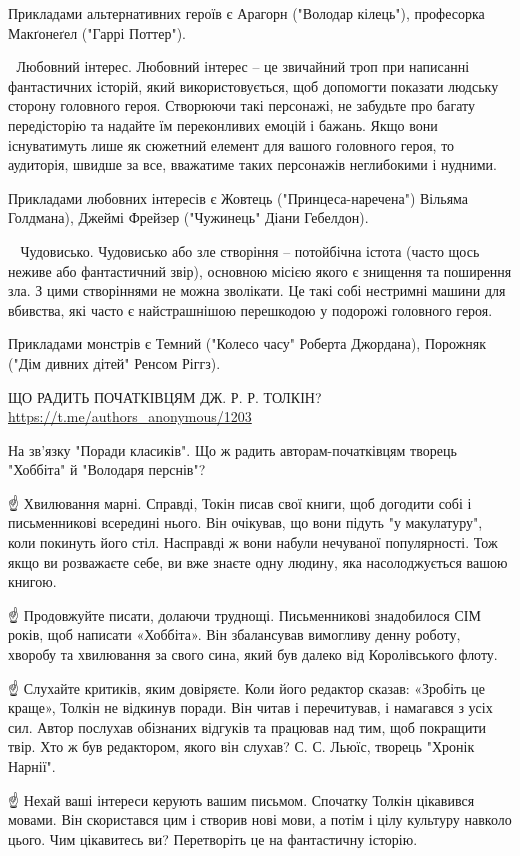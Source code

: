Прикладами альтернативних героїв є Арагорн ("Володар кілець"), професорка Макґонеґел ("Гаррі Поттер").

💞 Любовний інтерес.
Любовний інтерес – це звичайний троп при написанні фантастичних історій, який використовується, щоб допомогти показати людську сторону головного героя. Створюючи такі персонажі, не забудьте про багату передісторію та надайте їм переконливих емоцій і бажань. Якщо вони існуватимуть лише як сюжетний елемент для вашого головного героя, то аудиторія, швидше за все, вважатиме таких персонажів неглибокими і нудними. 

Прикладами любовних інтересів є Жовтець ("Принцеса-наречена") Вільяма Голдмана), Джеймі Фрейзер ("Чужинець" Діани Гебелдон).

🧟‍♀️ Чудовисько.
Чудовисько або зле створіння – потойбічна істота (часто щось неживе або фантастичний звір), основною місією якого є знищення та поширення зла. З цими створіннями не можна зволікати. Це такі собі нестримні машини для вбивства, які часто є найстрашнішою перешкодою у подорожі головного героя. 

Прикладами монстрів є Темний ("Колесо часу" Роберта Джордана), Порожняк ("Дім дивних дітей" Ренсом Ріггз).

ЩО РАДИТЬ ПОЧАТКІВЦЯМ ДЖ. Р. Р. ТОЛКІН?
\url{https://t.me/authors_anonymous/1203}

На зв'язку "Поради класиків". 
Що ж радить авторам-початківцям творець "Хоббіта" й "Володаря перснів"?

☝️ Хвилювання марні.
Справді, Токін писав свої книги, щоб догодити собі і письменникові всередині нього. Він очікував, що вони підуть "у макулатуру", коли покинуть його стіл. Насправді ж вони набули нечуваної популярності. Тож якщо ви розважаєте себе, ви вже знаєте одну людину, яка насолоджується вашою книгою.

☝️ Продовжуйте писати, долаючи труднощі.
Письменникові знадобилося СІМ років, щоб написати «Хоббіта». Він збалансував вимогливу денну роботу, хворобу та хвилювання за свого сина, який був далеко від Королівського флоту. 

☝️ Слухайте критиків, яким довіряєте.
Коли його редактор сказав: «Зробіть це краще», Толкін не відкинув поради. Він читав і перечитував, і намагався з усіх сил.
Автор послухав обізнаних відгуків та працював над тим, щоб покращити твір. Хто ж був редактором, якого він слухав? С. С. Льюїс, творець "Хронік Нарнії".

☝️ Нехай ваші інтереси керують вашим письмом.
Спочатку Толкін цікавився мовами. Він скористався цим і створив нові мови, а потім і цілу культуру навколо цього. Чим цікавитесь ви? Перетворіть це на фантастичну історію.

